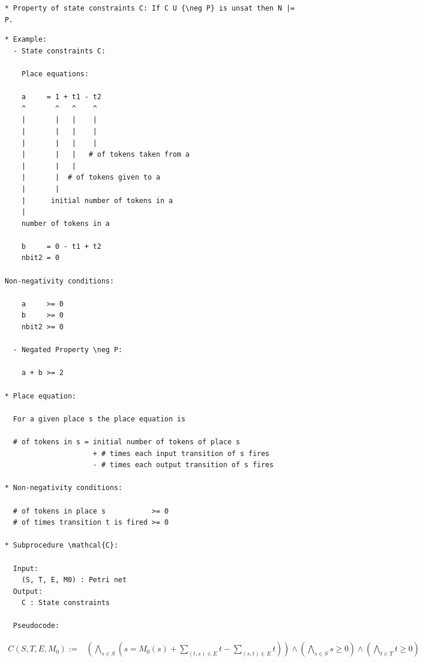 \documentclass{llncs}
\begin{document}
\begin{center}
\end{center}

\begin{verbatim}
* Property of state constraints C: If C U {\neg P} is unsat then N |= P.
\end{verbatim}

\newpage

\begin{verbatim}
* Example:
  - State constraints C:

    Place equations:
  
    a     = 1 + t1 - t2
    ^       ^   ^    ^
    |       |   |    |
    |       |   |    |
    |       |   |    |
    |       |   |   # of tokens taken from a
    |       |   |    
    |       |  # of tokens given to a
    |       |
    |      initial number of tokens in a
    |
    number of tokens in a

    b     = 0 - t1 + t2
    nbit2 = 0
    
Non-negativity conditions:
  
    a     >= 0
    b     >= 0
    nbit2 >= 0

  - Negated Property \neg P:

    a + b >= 2

* Place equation:
  
  For a given place s the place equation is

  # of tokens in s = initial number of tokens of place s
                     + # times each input transition of s fires
                     - # times each output transition of s fires

* Non-negativity conditions:

  # of tokens in place s           >= 0
  # of times transition t is fired >= 0

* Subprocedure \mathcal{C}:

  Input:
    (S, T, E, M0) : Petri net
  Output:
    C : State constraints

  Pseudocode:

  \end{verbatim}
\begin{align*}
  C(S, T, E, M_0) :=& \left( \bigwedge_{s \in S} \left(
    s = M_0(s) + \sum_{(t, s) \in E} t - \sum_{(s, t) \in E} t
  \right) \right) \land
    \left( \bigwedge_{s \in S} s \ge 0 \right) \land
    \left( \bigwedge_{t \in T} t \ge 0 \right)
\end{align*}
\end{document}
